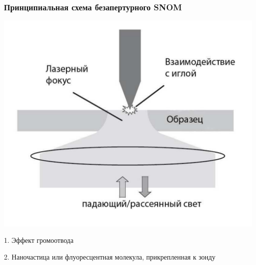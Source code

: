\documentclass[9pt, compress, xcolor=table]{beamer}
\begin{document}
\begin{frame}[fragile]
\frametitle{Принципиальная схема безапертурного SNOM}

\begin{center}
\includegraphics[scale=0.3]{apertless}
\end{center}

1. Эффект громоотвода

2. Наночастица или флуоресцентная молекула, прикрепленная к зонду

\end{frame}
\end{document}
